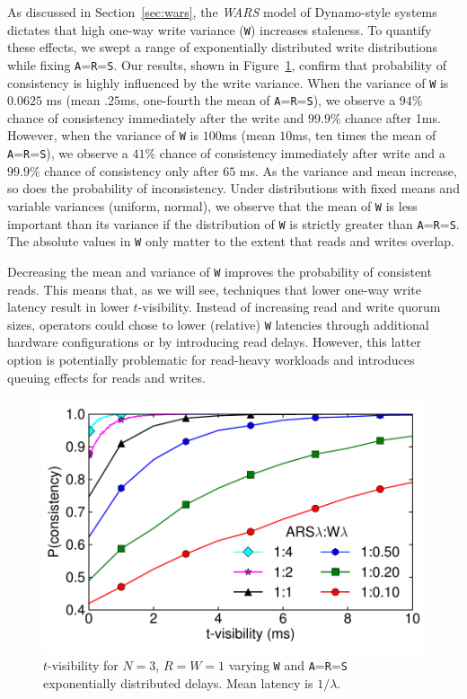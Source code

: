 \documentclass{vldb}
\begin{document}
As discussed in Section~\ref{sec:wars}, the \textit{WARS} model of
Dynamo-style systems dictates that high one-way write variance
(\texttt{W}) increases staleness.  To quantify these effects, we swept
a range of exponentially distributed write distributions while fixing
\texttt{A}=\texttt{R}=\texttt{S}.  Our results, shown in
Figure~\ref{fig:varydelay}, confirm that probability of consistency is
highly influenced by the write variance.  When the variance of
\texttt{W} is $0.0625$ ms (mean $.25$ms, one-fourth the mean of
\texttt{A}=\texttt{R}=\texttt{S}), we observe a $94\%$ chance of
consistency immediately after the write and $99.9\%$ chance after 1ms.
However, when the variance of \texttt{W} is $100$ms (mean $10$ms, ten
times the mean of \texttt{A}=\texttt{R}=\texttt{S}), we observe a
$41\%$ chance of consistency immediately after write and a $99.9\%$
chance of consistency only after $65$ ms.  As the variance and mean
increase, so does the probability of inconsistency.  Under
distributions with fixed means and variable variances (uniform,
normal), we observe that the mean of \texttt{W} is less important than
its variance if the distribution of \texttt{W} is strictly greater
than \texttt{A}=\texttt{R}=\texttt{S}.  The absolute values in 
\texttt{W} only matter to the extent that reads and writes overlap.

Decreasing the mean and variance of \texttt{W} improves the
probability of consistent reads.  This means that, as we will see,
techniques that lower one-way write latency result in lower
$t$-visibility.  Instead of increasing read and write quorum sizes,
operators could chose to lower (relative) \texttt{W} latencies through
additional hardware configurations or by introducing read delays.
However, this latter option is potentially problematic for read-heavy
workloads and introduces queuing effects for reads and writes.

\begin{figure}
\centering
\includegraphics[width=.85\columnwidth]{figs/rwratio.pdf}
\vspace{-14pt}
\caption{$t$-visibility for $N$$=$$3$, $R$$=$$W$$=$$1$ varying \texttt{W} and \texttt{A}=\texttt{R}=\texttt{S} exponentially distributed delays.  Mean latency is $1/\lambda$.}
\vspace{-4pt}
\label{fig:varydelay}
\end{figure}
\end{document}
